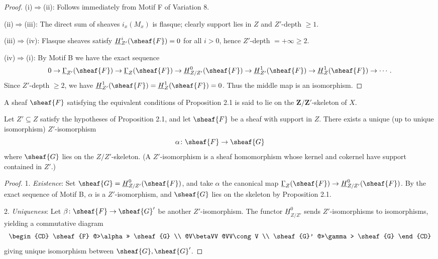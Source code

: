 \begin{proof}
\textup{(i)}\(\Rightarrow\)(ii): Follows immediately from Motif F of Variation 8.

\textup{(ii)}\(\Rightarrow\)(iii): The direct sum of sheaves \(i_x(M_x)\) is flasque; clearly support lies in \(Z\) and \(Z'\)-depth \(\ge 1\).

\textup{(iii)}\(\Rightarrow\)(iv): Flasque sheaves satisfy \(\underline{H}_{Z'}^i(\sheaf{F})=0\) for all \(i>0\), hence \(Z'\)-depth \(=+\infty\ge 2\).

\setcounter{page}{231}
\textup{(iv)}\(\Rightarrow\)(i): By Motif B we have the exact sequence
\[
0\to\underline{\Gamma}_{Z'}(\sheaf{F})\to\underline{\Gamma}_Z(\sheaf{F})\to\underline{H}_{Z/Z'}^0(\sheaf{F})
\to\underline{H}_{Z'}^1(\sheaf{F})\to\underline{H}_Z^1(\sheaf{F})\to\cdots.
\]
Since \(Z'\)-depth \(\ge 2\), we have \(\underline{H}_{Z'}^1(\sheaf{F})=\underline{H}_Z^1(\sheaf{F})=0\). Thus the middle map is an isomorphism.
\end{proof}

\begin{definition}
A sheaf \(\sheaf{F}\) satisfying the equivalent conditions of Proposition 2.1 is said to lie on the \(\boldsymbol{Z/Z'}\)-skeleton of \(X\).
\end{definition}

\setcounter{page}{232}
\begin{lemma}
Let \(Z'\subseteq Z\) satisfy the hypotheses of Proposition 2.1, and let \(\sheaf{F}\) be a sheaf with support in \(Z\). There exists a unique (up to unique isomorphism) \(Z'\)-isomorphism
\[
\alpha\colon \sheaf{F} \to \sheaf{G}
\]
where \(\sheaf{G}\) lies on the \(Z/Z'\)-skeleton.
(A \(Z'\)-isomorphism is a sheaf homomorphism whose kernel and cokernel have support contained in \(Z'\).)
\end{lemma}

\begin{proof}
1. \textit{Existence}: Set \(\sheaf{G} = \underline{H}_{Z/Z'}^0(\sheaf{F})\), and take \(\alpha\) the canonical map \(\underline{\Gamma}_Z(\sheaf{F})\to\underline{H}_{Z/Z'}^0(\sheaf{F})\). By the exact sequence of Motif B, \(\alpha\) is a \(Z'\)-isomorphism, and \(\sheaf{G}\) lies on the skeleton by Proposition 2.1.

2. \textit{Uniqueness}: Let \(\beta\colon\sheaf{F}\to\sheaf{G}'\) be another \(Z'\)-isomorphism. The functor \(\underline{H}_{Z/Z'}^0\) sends \(Z'\)-isomorphisms to isomorphisms, yielding a commutative diagram
\[
\begin{CD}
\sheaf{F} @>\alpha>> \sheaf{G} \\
@V\betaVV @VV\cong V \\
\sheaf{G}' @>>\gamma> \sheaf{G}
\end{CD}
\]
giving unique isomorphism between \(\sheaf{G},\sheaf{G}'\).
\end{proof}

